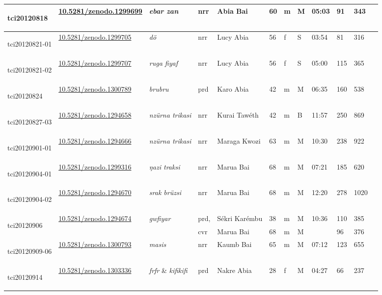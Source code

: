 \begin{landscape}
{\begin{longtable}{p{}lllllllllll}
	\hypertarget{tci20120818}{tci20120818} &\href{https://zenodo.org/record/1299699}{10.5281/zenodo.1299699}& \emph{ebar zan} & nrr & Abia Bai & 60 & m & M & 05:03 & 91&343\\\hline
	\hypertarget{tci20120821-01}{tci20120821-01} &\href{https://zenodo.org/record/1299705}{10.5281/zenodo.1299705}& \emph{dö} & nrr & Lucy Abia & 56 & f & S & 03:54 & 81&316\\\hline
	\hypertarget{tci20120821-02}{tci20120821-02} &\href{https://zenodo.org/record/1299707}{10.5281/zenodo.1299707}& \emph{ruga fiyaf} & nrr & Lucy Abia & 56 & f & S & 05:00 & 115&365\\\hline
	\hypertarget{tci20120824}{tci20120824} &\href{https://zenodo.org/record/1300789}{10.5281/zenodo.1300789}& \emph{brubru} & prd & Karo Abia & 42 & m & M & 06:35 & 160&538\\\hline
	\hypertarget{tci20120827-03}{tci20120827-03} &\href{https://zenodo.org/record/1294658}{10.5281/zenodo.1294658}& \emph{nzürna trikasi} & nrr & Kurai Tawéth & 42 & m & B & 11:57 & 250&869\\\hline
	\hypertarget{tci20120901-01}{tci20120901-01} &\href{https://zenodo.org/record/1294666}{10.5281/zenodo.1294666}& \emph{nzürna trikasi} & nrr & Maraga Kwozi & 63 & m & M & 10:30 & 238&922\\\hline
	\hypertarget{tci20120904-01}{tci20120904-01} &\href{https://zenodo.org/record/1299316}{10.5281/zenodo.1299316}& \emph{ŋazi traksi} & nrr & Marua Bai & 68 & m & M & 07:21 & 185&620\\\hline
	\hypertarget{tci20120904-02}{tci20120904-02} &\href{https://zenodo.org/record/1294670}{10.5281/zenodo.1294670}& \emph{srak brüzsi} & nrr & Marua Bai & 68 & m & M & 12:20 & 278&1020\\\hline
	\multirow{2}{*}{\hypertarget{tci20120906}{tci20120906}} &\multirow{2}{*}{\href{https://zenodo.org/record/1294674}{10.5281/zenodo.1294674}}& \multirow{2}{*}{\emph{gwfiyar}} &prd, & Sékri Karémbu & 38 & m & M & \multirow{2}{*}{10:36} & 110&385\\
	&&&cvr& Marua Bai & 68 & m & M & &96&376\\\hline
	\hypertarget{tci20120909-06}{tci20120909-06} &\href{https://zenodo.org/record/1300793}{10.5281/zenodo.1300793}& \emph{masis} & nrr & Kaumb Bai & 65 & m & M & 07:12 & 123&655\\\hline
	\hypertarget{tci20120914}{tci20120914} &\href{https://zenodo.org/record/1303336}{10.5281/zenodo.1303336}& \emph{frfr} \& \emph{kifikifi} & prd & Nakre Abia & 28 & f & M & 04:27 & 66&237\\\hline

\end{longtable}}
\end{landscape}
